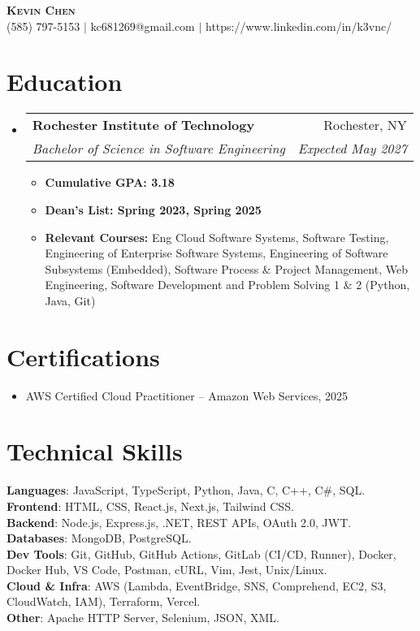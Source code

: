 \documentclass[letterpaper,11pt]{article}
\makeatletter
\newcommand{\resumeItem}[1]{
  \item\small{
    {#1 \vspace{-2pt}}
  }
}
\newcommand{\resumeSubheading}[4]{
  \vspace{-2pt}\item
    \begin{tabular*}{0.97\textwidth}[t]{l@{\extracolsep{\fill}}r}
      \textbf{#1} & #2 \\
      \textit{\small#3} & \textit{\small #4} \\
    \end{tabular*}\vspace{-7pt}
}
\newcommand{\resumeSubHeadingListStart}{\begin{itemize}[leftmargin=0.15in, label={}]}
\newcommand{\resumeSubHeadingListEnd}{\end{itemize}}
\newcommand{\resumeItemListStart}{\begin{itemize}}
\newcommand{\resumeItemListEnd}{\end{itemize}\vspace{-5pt}}
\makeatother
\begin{document}
\begin{center}
    \textbf{\Huge \scshape Kevin Chen} \\ \vspace{1pt}
    \small (585) 797-5153 $|$ kc681269@gmail.com $|$ 
    https://www.linkedin.com/in/k3vnc/ 
\end{center}

\section{Education}
  \resumeSubHeadingListStart
    \resumeSubheading
      {Rochester Institute of Technology}{Rochester, NY}
      {Bachelor of Science in Software Engineering}{Expected May 2027}
      \resumeItemListStart
        \resumeItem{\textbf{Cumulative GPA: 3.18}}
        \resumeItem{\textbf{Dean's List: Spring 2023, Spring 2025}}
        \resumeItem{\textbf{Relevant Courses:} Eng Cloud Software Systems, Software Testing, Engineering of Enterprise Software Systems, Engineering of Software Subsystems (Embedded), Software Process \& Project Management, Web Engineering, Software Development and Problem Solving 1 \& 2 (Python, Java, Git)}
      \resumeItemListEnd
  \resumeSubHeadingListEnd

\section{Certifications}
  \resumeSubHeadingListStart
    \resumeItem{AWS Certified Cloud Practitioner -- Amazon Web Services, 2025}
  \resumeSubHeadingListEnd

\section{Technical Skills}
\begin{itemize}[leftmargin=0.15in, label={}]
\small{\item{
\textbf{Languages}{: JavaScript, TypeScript, Python, Java, C, C++, C#, SQL.} \\
\textbf{Frontend}{: HTML, CSS, React.js, Next.js, Tailwind CSS.} \\
\textbf{Backend}{: Node.js, Express.js, .NET, REST APIs, OAuth 2.0, JWT.} \\
\textbf{Databases}{: MongoDB, PostgreSQL.} \\
\textbf{Dev Tools}{: Git, GitHub, GitHub Actions, GitLab (CI/CD, Runner), Docker, Docker Hub, VS Code, Postman, cURL, Vim, Jest, Unix/Linux.} \\
\textbf{Cloud \& Infra}{: AWS (Lambda, EventBridge, SNS, Comprehend, EC2, S3, CloudWatch, IAM), Terraform, Vercel.} \\
\textbf{Other}{: Apache HTTP Server, Selenium, JSON, XML.}}}
\end{itemize}
\end{document}
